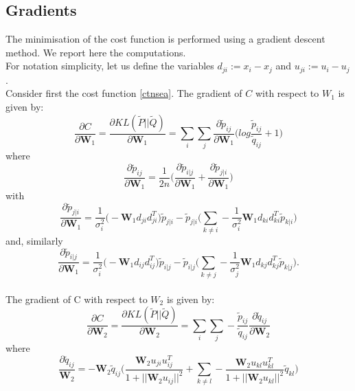 \documentclass[11pt]{article}
\begin{document}
\subsection{Gradients}
The minimisation of the cost function is performed using a gradient descent method. We report here the computations. 
\\
For notation simplicity, let us define the variables $d_{ji}:=x_i - x_j$ and $u_{ji}:=u_i - u_j$.
\\
Consider first the cost function \ref{ctnsea}. The gradient of $C$ with respect to $W_1$ is given by:
\begin{equation}
\frac{\partial C}{\partial \mathbf{W}_1}=\frac{\partial KL(\tilde{P}||\tilde{Q})}{\partial \mathbf{W}_1}=\sum_{i}\sum_{j}\frac{\partial\tilde{p}_{ij}}{\partial \mathbf{W}_1} \Big( log \frac{\tilde{p}_{ij}}{\tilde{q}_{ij}} + 1 \Big)
\end{equation}
where
\begin{equation}
\frac{\partial\tilde{p}_{ij}}{\partial \mathbf{W}_1} = \frac{1}{2n}\Big(\frac{\partial\tilde{p}_{i|j}}{\partial \mathbf{W}_1} + \frac{\partial\tilde{p}_{j|i}}{\partial \mathbf{W}_1}\Big)
\end{equation}
with
\begin{equation}
\frac{\partial\tilde{p}_{j|i}}{\partial \mathbf{W}_1} = \frac{1}{\sigma_i^2}\Big( - \mathbf{W}_1 d_{ji} d_{ji}^T\Big) \tilde{p}_{j|i} -  \tilde{p}_{j|i} \Big( \sum_{k\neq i} - \frac{1}{\sigma_i^2} \mathbf{W}_1 d_{ki} d_{ki}^T  \tilde{p}_{k|i}\Big)
\end{equation}
and, similarly 
\begin{equation}
\frac{\partial\tilde{p}_{i|j}}{\partial \mathbf{W}_1} = \frac{1}{\sigma_i^2}\Big( - \mathbf{W}_1 d_{ij} d_{ij}^T\Big) \tilde{p}_{i|j} -  \tilde{p}_{i|j} \Big( \sum_{k\neq j} - \frac{1}{\sigma_j^2} \mathbf{W}_1 d_{kj} d_{kj}^T  \tilde{p}_{k|j}\Big).
\end{equation}
\\
The gradient of C with respect to $W_2$ is given by:
\begin{equation}
\frac{\partial C}{\partial \mathbf{W}_2}=\frac{\partial KL(\tilde{P}||\tilde{Q})}{\partial \mathbf{W}_2}=\sum_{i}\sum_{j} - \frac{\tilde{p}_{ij} }{\tilde{q}_{ij} }\frac{\partial \tilde{q}_{ij} }{\partial\mathbf{W}_2} 
\end{equation}
where
\begin{equation}
\frac{\partial \tilde{q}_{ij} }{\mathbf{W}_2}= - \mathbf{W}_2 \tilde{q}_{ij} \Big (\frac{\mathbf{W}_2 u_{ji} u_{ij}^T}{1 + ||\mathbf{W}_2 u_{ij}||^2} + \sum_{k \neq l} -\frac{\mathbf{W}_2u_{kl}u_{kl}^T}{1 + ||\mathbf{W}_2 u_{kl}||^2} \tilde{q}_{kl}\Big)
\end{equation}
\end{document}
